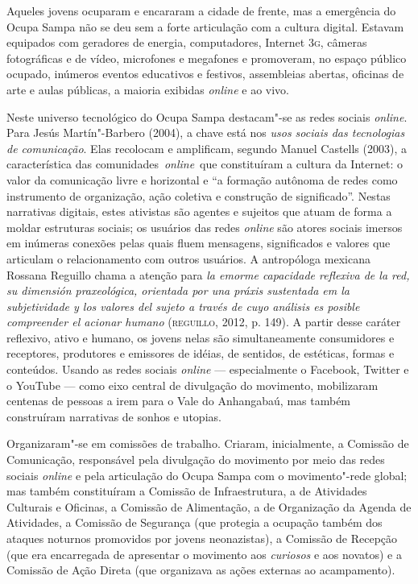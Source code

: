 Aqueles jovens ocuparam e encararam a cidade de frente, mas a
emergência do Ocupa Sampa não se deu sem a forte articulação com a
cultura digital. Estavam equipados com geradores de energia,
computadores, Internet \textsc{3g}, câmeras fotográficas e de vídeo, microfones e
megafones e promoveram, no espaço público ocupado, inúmeros eventos
educativos e festivos, assembleias abertas, oficinas de arte e aulas
públicas, a maioria exibidas \textit{online} e ao vivo.

Neste universo tecnológico do Ocupa Sampa destacam"-se as redes sociais
\textit{online}. Para Jesús Martín"-Barbero (2004), a chave está nos \textit{usos
sociais das tecnologias de comunicação}. Elas recolocam e amplificam,
segundo Manuel Castells (2003), a característica das
comunidades~\textit{online}~que constituíram a cultura da Internet: o
valor da comunicação livre e horizontal e ``a formação autônoma de redes
como instrumento de organização, ação coletiva e construção de
significado''. Nestas narrativas digitais, estes ativistas são
agentes e sujeitos que atuam de forma a moldar estruturas sociais; os
usuários das redes \textit{online} são atores sociais imersos em
inúmeras conexões pelas quais fluem mensagens, significados e valores
que articulam o relacionamento com outros usuários. A antropóloga
mexicana Rossana Reguillo chama a atenção para \textit{la emorme capacidade
reflexiva de la red, su dimensión praxeológica, orientada por una práxis
sustentada em la subjetividade y los valores del sujeto a través de cuyo
análisis es posible compreender el acionar humano} (\textsc{reguillo}, 2012, p.
149). A partir desse caráter reflexivo, ativo e humano, os jovens
nelas  são simultaneamente consumidores e receptores, produtores e
emissores de idéias, de sentidos, de estéticas, formas e conteúdos.
Usando as redes sociais \textit{online} --- especialmente o Facebook, Twitter e o
YouTube --- como eixo central de divulgação do movimento, mobilizaram
centenas de pessoas a irem para o Vale do Anhangabaú, mas também
construíram narrativas de sonhos e utopias.

Organizaram"-se em comissões de trabalho. Criaram, inicialmente, a
Comissão de Comunicação, responsável pela divulgação do movimento por
meio das redes sociais \textit{online} e pela articulação do Ocupa Sampa
com o movimento"-rede global; mas também constituíram a Comissão de
Infraestrutura, a de Atividades Culturais e Oficinas, a Comissão de
Alimentação, a de Organização da Agenda de Atividades, a Comissão de
Segurança (que protegia a ocupação também dos ataques noturnos
promovidos por jovens neonazistas), a Comissão de Recepção (que era
encarregada de apresentar o movimento aos \textit{curiosos} e aos novatos) e
a Comissão de Ação Direta (que organizava as ações externas ao
acampamento).

